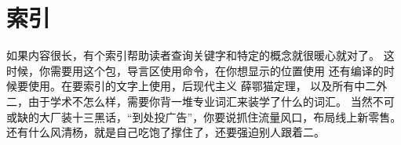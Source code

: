 
\section{索引}

如果内容很长，有个索引帮助读者查询关键字和特定的概念就很暖心就对了。
这时候，你需要用这个包，导言区使用命令，在你想显示的位置使用
还有编译的时候要使用。在要索引的文字上使用，后现代主义
薛鄂猫定理， 以及所有中二外二，由于学术不怎么样，需要你背一堆专业词汇来装学了什么的词汇。
当然不可或缺的大厂装十三黑话，“到处投广告”，你要说抓住流量风口，布局线上新零售。
还有什么风清杨，就是自己吃饱了撑住了，还要强迫别人跟着二。


